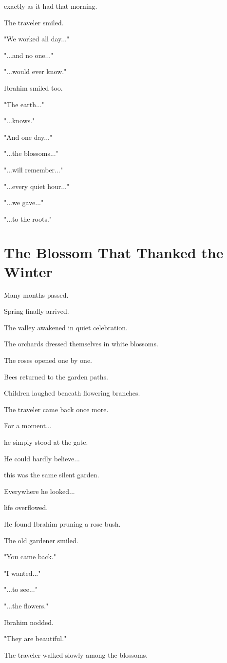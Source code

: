 \documentclass[12pt,openany]{book}
\begin{document}
exactly as it had that morning.

The traveler smiled.

"We worked all day..."

"...and no one..."

"...would ever know."

Ibrahim smiled too.

"The earth..."

"...knows."

"And one day..."

"...the blossoms..."

"...will remember..."

"...every quiet hour..."

"...we gave..."

"...to the roots."
\section*{The Blossom That Thanked the Winter}

Many months passed.

Spring finally arrived.

The valley awakened in quiet celebration.

The orchards dressed themselves in white blossoms.

The roses opened one by one.

Bees returned to the garden paths.

Children laughed beneath flowering branches.

The traveler came back once more.

For a moment...

he simply stood at the gate.

He could hardly believe...

this was the same silent garden.

Everywhere he looked...

life overflowed.

He found Ibrahim pruning a rose bush.

The old gardener smiled.

"You came back."

"I wanted..."

"...to see..."

"...the flowers."

Ibrahim nodded.

"They are beautiful."

The traveler walked slowly among the blossoms.
\end{document}
